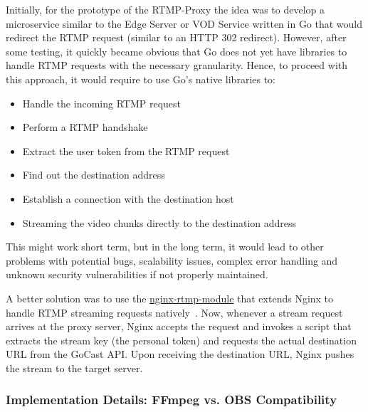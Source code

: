 Initially, for the prototype of the RTMP-Proxy the idea was to develop a microservice similar to the Edge Server or VOD Service written in Go that would redirect the \ac{RTMP} request (similar to an HTTP 302 redirect). However, after some testing, it quickly became obvious that Go does not yet have libraries to handle \ac{RTMP} requests with the necessary granularity. Hence, to proceed with this approach, it would require to use Go's native libraries to: 
\begin{itemize}
\item Handle the incoming \ac{RTMP} request
\item Perform a \ac{RTMP} handshake
\item Extract the user token from the \ac{RTMP} request
\item Find out the destination address
\item Establish a connection with the destination host
\item Streaming the video chunks directly to the destination address
\end{itemize}

\noindent This might work short term, but in the long term, it would lead to other problems with potential bugs, scalability issues, complex error handling and unknown security vulnerabilities if not properly maintained.

A better solution was to use the \href{https://github.com/arut/nginx-rtmp-module}{nginx-rtmp-module}\footnotemark[7] that extends Nginx to handle \ac{RTMP} streaming requests natively~\parencite{nginx_rtmp_module}. 
Now, whenever a stream request arrives at the proxy server, Nginx accepts the request and invokes a script that extracts the stream key (the personal token) and requests the actual destination URL from the GoCast \ac{API}. Upon receiving the destination URL, Nginx pushes the stream to the target server.

\subsubsection{Implementation Details: FFmpeg vs. OBS Compatibility}

